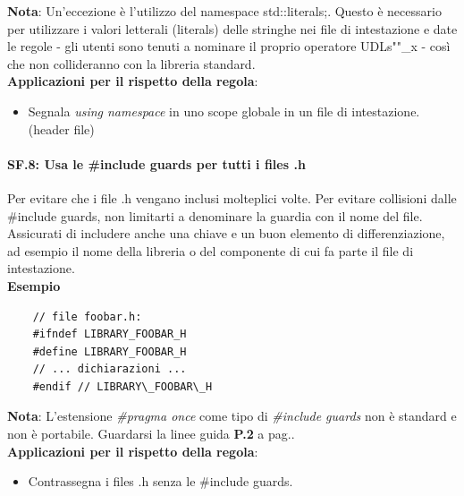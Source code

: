 \textsf{\small \textbf{Nota}: Un'eccezione è l'utilizzo del namespace std::literals;. Questo è necessario per utilizzare i valori letterali (literals) delle stringhe nei file di intestazione e date le regole - gli utenti sono tenuti a nominare il proprio operatore UDLs""\_x - così che non collideranno con la libreria standard.} \\

\textsf{\small \textbf{Applicazioni per il rispetto della regola}: }

\begin{itemize}
	\item \textsf{\small Segnala \emph{using namespace} in uno scope globale in un file di intestazione. (header file)}
\end{itemize}

\paragraph{SF.8: Usa le \#include guards per tutti i files .h}

\textsf{\small Per evitare che i file .h vengano inclusi molteplici volte. Per evitare collisioni dalle \#include guards, non limitarti a denominare la guardia con il nome del file. Assicurati di includere anche una chiave e un buon elemento di differenziazione, ad esempio il nome della libreria o del componente di cui fa parte il file di intestazione.} \\

\textsf{\small \textbf{Esempio}}

\begin{lstlisting}
	// file foobar.h:
	#ifndef LIBRARY_FOOBAR_H
	#define LIBRARY_FOOBAR_H
	// ... dichiarazioni ...
	#endif // LIBRARY\_FOOBAR\_H
\end{lstlisting}

\textsf{\small \textbf{Nota}: L'estensione \emph{\#pragma once} come tipo di \emph{\#include guards} non è standard e non è portabile. Guardarsi la linee guida \textbf{P.2} a pag.\pageref{P_2}.} \\

\textsf{\small \textbf{Applicazioni per il rispetto della regola}: }

\begin{itemize}
	\item \textsf{\small Contrassegna i files .h senza le \#include guards.}
\end{itemize}

